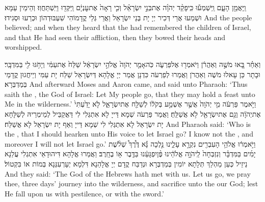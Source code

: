 {וַֽיַּאֲמֵ֖ן הָעָ֑ם וַֽיִּשְׁמְע֡וּ כִּֽי\maqqaf פָקַ֨ד יְהֹוָ֜ה אֶת\maqqaf בְּנֵ֣י יִשְׂרָאֵ֗ל וְכִ֤י רָאָה֙ אֶת\maqqaf עׇנְיָ֔ם וַֽיִּקְּד֖וּ וַיִּֽשְׁתַּחֲוֽוּ׃}
{וְהֵימֵין עַמָּא וּשְׁמַעוּ אֲרֵי דְּכִיר יְיָ יָת בְּנֵי יִשְׂרָאֵל וַאֲרֵי גְּלֵי קֳדָמוֹהִי שִׁעְבּוּדְהוֹן וּכְרַעוּ וּסְגִידוּ׃}
{And the people believed; and when they heard that the \lord\space had remembered the children of Israel, and that He had seen their affliction, then they bowed their heads and worshipped.}{}

\newperek
{}%
{וְאַחַ֗ר בָּ֚אוּ מֹשֶׁ֣ה וְאַהֲרֹ֔ן וַיֹּאמְר֖וּ אֶל\maqqaf פַּרְעֹ֑ה כֹּֽה\maqqaf אָמַ֤ר יְהֹוָה֙ אֱלֹהֵ֣י יִשְׂרָאֵ֔ל שַׁלַּח֙ אֶת\maqqaf עַמִּ֔י וְיָחֹ֥גּוּ לִ֖י בַּמִּדְבָּֽר׃}
{וּבָתָר כֵּן עָאלוּ מֹשֶׁה וְאַהֲרֹן וַאֲמַרוּ לְפַרְעֹה כִּדְנָן אֲמַר יְיָ אֱלָהָא דְּיִשְׂרָאֵל שַׁלַּח יָת עַמִּי וְיֵיחֲגוּן קֳדָמַי בְּמַדְבְּרָא׃}
{And afterward Moses and Aaron came, and said unto Pharaoh: ‘Thus saith the \lord, the God of Israel: Let My people go, that they may hold a feast unto Me in the wilderness.’}{}
{וַיֹּ֣אמֶר פַּרְעֹ֔ה מִ֤י יְהֹוָה֙ אֲשֶׁ֣ר אֶשְׁמַ֣ע בְּקֹל֔וֹ לְשַׁלַּ֖ח אֶת\maqqaf יִשְׂרָאֵ֑ל לֹ֤א יָדַ֙עְתִּי֙ אֶת\maqqaf יְהֹוָ֔ה וְגַ֥ם אֶת\maqqaf יִשְׂרָאֵ֖ל לֹ֥א אֲשַׁלֵּֽחַ׃}
{וַאֲמַר פַּרְעֹה שְׁמָא דַּייָ לָא אִתְגְּלִי לִי דַּאֲקַבֵּיל לְמֵימְרֵיהּ לְשַׁלָּחָא יָת יִשְׂרָאֵל לָא אִתְגְּלִי לִי שְׁמָא דַּייָ וְאַף יָת יִשְׂרָאֵל לָא אֲשַׁלַּח׃}
{And Pharaoh said: ‘Who is the \lord, that I should hearken unto His voice to let Israel go? I know not the \lord, and moreover I will not let Israel go.’}{}
{וַיֹּ֣אמְר֔וּ אֱלֹהֵ֥י הָעִבְרִ֖ים נִקְרָ֣א עָלֵ֑ינוּ נֵ֣לְכָה נָּ֡א דֶּ֩רֶךְ֩ שְׁלֹ֨שֶׁת יָמִ֜ים בַּמִּדְבָּ֗ר וְנִזְבְּחָה֙ לַֽיהֹוָ֣ה אֱלֹהֵ֔ינוּ פֶּ֨ן\maqqaf יִפְגָּעֵ֔נוּ בַּדֶּ֖בֶר א֥וֹ בֶחָֽרֶב׃}
{וַאֲמַרוּ אֱלָהָא דִּיהוּדָאֵי אִתְגְלִי עֲלַנָא נֵיזֵיל כְּעַן מַהְלַךְ תְּלָתָא יוֹמִין בְּמַדְבְּרָא וּנְדַבַּח קֳדָם יְיָ אֱלָהַנָא דִּלְמָא יְעָרְעִנַּנָא בְּמוֹת אוֹ בִּקְטוֹל׃}
{And they said: ‘The God of the Hebrews hath met with us. Let us go, we pray thee, three days’ journey into the wilderness, and sacrifice unto the \lord\space our God; lest He fall upon us with pestilence, or with the sword.’}{}
